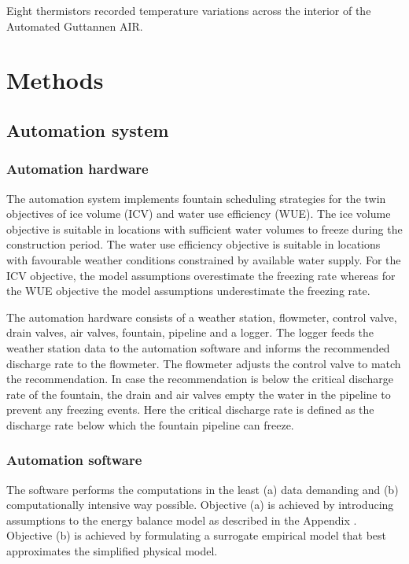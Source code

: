 \documentclass[tc, manuscript]{copernicus}
\begin{document}
Eight thermistors recorded temperature variations across the interior of the Automated Guttannen AIR. 

\section{Methods}

\subsection{Automation system}

\subsubsection{Automation hardware}

The automation system implements fountain scheduling strategies for the twin objectives of ice volume (ICV) and
water use efficiency (WUE). The ice volume objective is suitable in locations with sufficient water volumes to
freeze during the construction period. The water use efficiency objective is suitable in locations with
favourable weather conditions constrained by available water supply. For the ICV objective, the model
assumptions overestimate the freezing rate whereas for the WUE objective the model assumptions underestimate the
freezing rate. 

The automation hardware consists of a weather station, flowmeter, control valve, drain valves, air valves,
fountain, pipeline and a logger. The logger feeds the weather station data to the automation software and
informs the recommended discharge rate to the flowmeter. The flowmeter adjusts the control valve to match the
recommendation. In case the recommendation is below the critical discharge rate of the fountain, the drain and
air valves empty the water in the pipeline to prevent any freezing events. Here the critical discharge rate is
defined as the discharge rate below which the fountain pipeline can freeze.

\subsubsection{Automation software}

The software performs the computations in the least (a) data demanding and (b) computationally intensive way
possible. Objective (a) is achieved by introducing assumptions to the energy balance model as described in the
Appendix . Objective (b) is achieved by formulating a surrogate empirical model that best approximates the
simplified physical model. 
\end{document}
